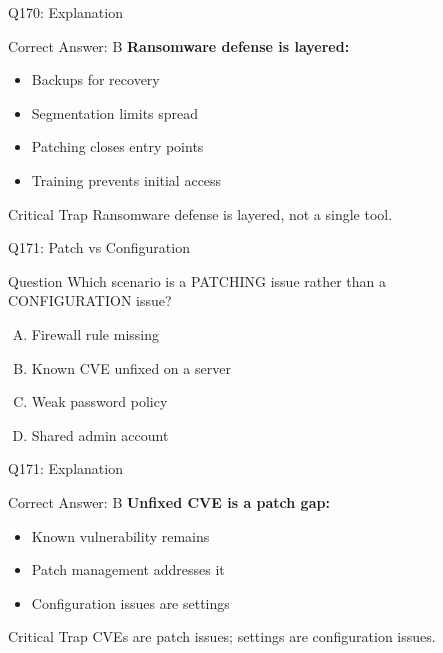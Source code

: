 \documentclass{beamer}
\begin{document}
	\begin{frame}{Q170: Explanation}
		\begin{block}{Correct Answer: B}
			\textbf{Ransomware defense is layered:}
			\begin{itemize}
				\item Backups for recovery
				\item Segmentation limits spread
				\item Patching closes entry points
				\item Training prevents initial access
			\end{itemize}
		\end{block}
		\begin{alertblock}{Critical Trap}
			Ransomware defense is layered, not a single tool.
		\end{alertblock}
	\end{frame}
	
	\begin{frame}{Q171: Patch vs Configuration}
		\begin{block}{Question}
			Which scenario is a PATCHING issue rather than a CONFIGURATION issue?
		\end{block}
		\begin{enumerate}[(A)]
			\item Firewall rule missing
			\item Known CVE unfixed on a server
			\item Weak password policy
			\item Shared admin account
		\end{enumerate}
	\end{frame}
	
	\begin{frame}{Q171: Explanation}
		\begin{block}{Correct Answer: B}
			\textbf{Unfixed CVE is a patch gap:}
			\begin{itemize}
				\item Known vulnerability remains
				\item Patch management addresses it
				\item Configuration issues are settings
			\end{itemize}
		\end{block}
		\begin{alertblock}{Critical Trap}
			CVEs are patch issues; settings are configuration issues.
		\end{alertblock}
	\end{frame}
	
\end{document}
